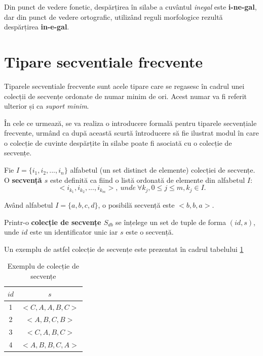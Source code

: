 \begin{ex}
Din punct de vedere fonetic, despărțirea în silabe a cuvântul \textit{inegal} este \textbf{i-ne-gal}, dar din punct de vedere ortografic, utilizând reguli morfologice rezultă despărțirea \textbf{in-e-gal}. 
\end{ex}

\section{Tipare secventiale frecvente}

Tiparele secventiale frecvente sunt acele tipare care se regasesc în cadrul unei colecții de secvențe ordonate de numar minim de ori. Acest numar va fi referit ulterior și ca \textit{suport minim}. 

În cele ce urmează, se va realiza o introducere formală pentru tiparele secvențiale frecvente, urmând ca după această scurtă întroducere să fie ilustrat modul în care o colecție de cuvinte despărțite în silabe poate fi asociată cu o colecție de secvențe.

\begin{defi}
Fie $I = \{i_1, i_2, ...,i_n\}$ alfabetul (un set distinct de elemente) colecției de secvențe. O \textbf{secvență $s$} este definită ca fiind o listă ordonată de elemente din alfabetul $I$:
\begin{equation}
<i_{k_1},i_{k_2}, ...,i_{k_m}>,\ unde \ \forall k_j, 0 \leq j \leq m, k_j \in I.
\end{equation}
\end{defi}

\begin{ex} 
Având alfabetul $I=\{a,b,c,d\}$, o posibilă secvență este $<b,b,a>$.
\end{ex}

\begin{defi} 
Printr-o \textbf{colecție de secvențe $S_{db}$} se înțelege un set de tuple de forma $(id, s)$, unde $id$ este un identificator unic iar $s$ este o secvență. 
\end{defi}

\begin{ex}
Un exemplu de astfel colecție de secvențe este prezentat în cadrul tabelului \ref{table:sdb}
\end{ex}

\begin{table}[h]
\centering    
\begin{tabular}{|c|c|}    
\hline      
$id$ & $s$ \\
\hline                    
1 & $<C,A,A,B,C>$ \\
2 & $<A,B,C,B>$ \\
3 & $<C,A,B,C>$ \\
4 & $<A,B,B,C,A>$ \\
\hline                              
\end{tabular}
\caption{Exemplu de colecție de secvențe}
\label{table:sdb}               
\end{table}

